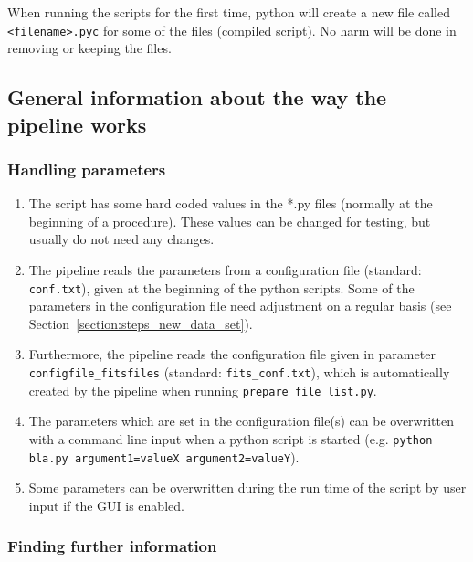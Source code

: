 \documentclass[10pt,a4paper]{article}
\begin{document}
When running the scripts for the first time, python will create a new file called \verb|<filename>.pyc| for some of the files (compiled script). No harm will be done in removing or keeping the files.


\subsection{General information about the way the pipeline works}

\subsubsection{Handling parameters}

\begin{enumerate}
  \item The script has some hard coded values in the *.py files (normally at the beginning of a procedure). These values can be changed for testing, but usually do not need any changes.
  \item The pipeline reads the parameters from a configuration file (standard: \verb|conf.txt|), given at the beginning of the python scripts. Some of the parameters in the configuration file need adjustment on a regular basis (see Section~\ref{section:steps_new_data_set}).
  \item Furthermore, the pipeline reads the configuration file given in parameter \verb|configfile_fitsfiles| (standard: \verb|fits_conf.txt|), which is automatically created by the pipeline when running \verb|prepare_file_list.py|.
  \item The parameters which are set in the configuration file(s) can be overwritten with a command line input when a python script is started (e.g. \verb|python bla.py argument1=valueX argument2=valueY|).
  \item Some parameters can be overwritten during the run time of the script by user input if the GUI is enabled.
\end{enumerate}

\subsubsection{Finding further information}
\end{document}
